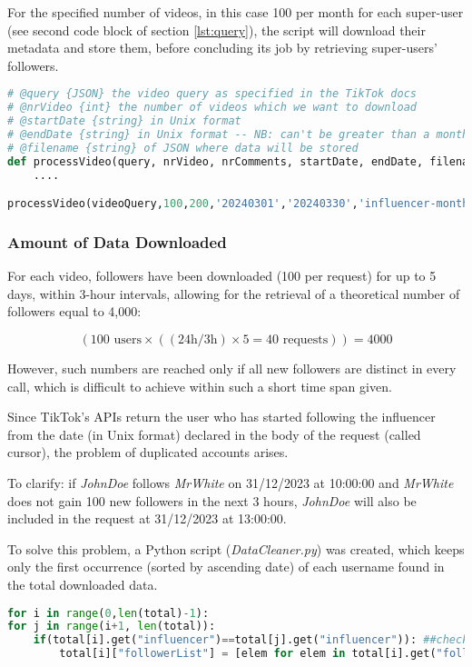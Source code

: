 For the specified number of videos, in this case 100 per month for each super-user (see second code block of section \ref{lst:query}), the script will download their metadata and store them, before concluding its job by retrieving super-users' followers.

\begin{lstlisting}[language=Python]
# @query {JSON} the video query as specified in the TikTok docs
# @nrVideo {int} the number of videos which we want to download
# @startDate {string} in Unix format
# @endDate {string} in Unix format -- NB: can't be greater than a month
# @filename {string} of JSON where data will be stored
def processVideo(query, nrVideo, nrComments, startDate, endDate, filename):
    ....

processVideo(videoQuery,100,200,'20240301','20240330','influencer-month')
\end{lstlisting}

\subsubsection*{Amount of Data Downloaded}

For each video, followers have been downloaded (100 per request) for up to 5 days, within 3-hour intervals, allowing for the retrieval of a theoretical number of followers equal to 4,000:

\[ (100 \text{ users} \times ((24 \text{h}/3 \text{h}) \times 5 = 40 \text{ requests})) = 4000 \]

However, such numbers are reached only if all new followers are distinct in every call, which is difficult to achieve
within such a short time span given.

Since TikTok's APIs return the user who has started following the influencer from the date (in Unix format) declared in the body of the request (called cursor), the problem of duplicated accounts arises.

To clarify: if \textit{JohnDoe} follows \textit{MrWhite} on 31/12/2023 at 10:00:00 and \textit{MrWhite} does not gain 100 new followers in the next 3 hours, \textit{JohnDoe} will also be included in the request at 31/12/2023 at 13:00:00.

To solve this problem, a Python script (\textit{DataCleaner.py}) was created, which keeps only the first occurrence (sorted by ascending date) of each username found in the total downloaded data.

\begin{lstlisting}[language=Python]
for i in range(0,len(total)-1):
for j in range(i+1, len(total)):
    if(total[i].get("influencer")==total[j].get("influencer")): ##check if the same influencer (we don't want to remove common followers)
        total[i]["followerList"] = [elem for elem in total[i].get("followerList") if elem not in total[j].get("followerList")]
\end{lstlisting}

